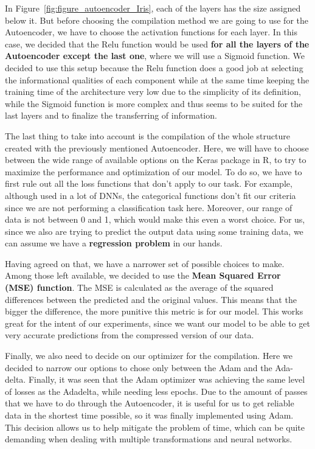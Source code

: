 In Figure~\ref{fig:figure_autoencoder_Iris}, each of the layers has the size assigned below it. But before choosing the compilation method we are going to use for the Autoencoder, we have to choose the activation functions for each layer. In this case, we decided that the Relu function would be used \textbf{for all the layers of the Autoencoder except the last one}, where we will use a Sigmoid function. We decided to use this setup because the Relu function does a good job at selecting the informational qualities of each component while at the same time keeping the training time of the architecture very low due to the simplicity of its definition, while the Sigmoid function is more complex and thus seems to be suited for the last layers and to finalize the transferring of information.

The last thing to take into account is the compilation of the whole structure created with the previously mentioned Autoencoder. Here, we will have to choose between the wide range of available options on the Keras package in R, to try to maximize the performance and optimization of our model. To do so, we have to first rule out all the loss functions that don't apply to our task. For example, although used in a lot of DNNs, the categorical functions don't fit our criteria since we are not performing a classification task here. Moreover, our range of data is not between 0 and 1, which would make this even a worst choice. For us, since we also are trying to predict the output data using some training data, we can assume we have a \textbf{regression problem} in our hands.

Having agreed on that, we have a narrower set of possible choices to make. Among those left available, we decided to use the \textbf{Mean Squared Error  (MSE) function}. The MSE is calculated as the average of the squared differences between the predicted and the original values. This means that the bigger the difference, the more punitive this metric is for our model. This works great for the intent of our experiments, since we want our model to be able to get very accurate predictions from the compressed version of our data. 

Finally, we also need to decide on our optimizer for the compilation. Here we decided to narrow our options to chose only between the Adam and the Ada-delta. Finally, it was seen that the Adam optimizer was achieving the same level of losses as the Adadelta, while needing less epochs. Due to the amount of passes that we have to do through the Autoencoder, it is useful for us to get reliable data in the shortest time possible, so it was finally implemented using Adam. This decision  allows us to help mitigate the problem of time, which can be quite demanding when dealing with multiple transformations and neural networks.


